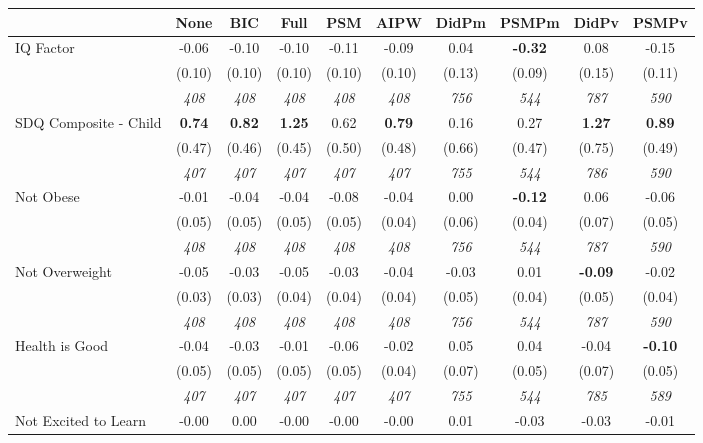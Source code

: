 \begin{tabular}{l c c c c c c c c c}
\toprule
 & None & BIC & Full & PSM & AIPW & DidPm & PSMPm & DidPv & PSMPv \\
\midrule
IQ Factor & -0.06 & -0.10 & -0.10 & -0.11 & -0.09 & 0.04 & \textbf{-0.32} & 0.08 & -0.15 \\
& (0.10) & (0.10) & (0.10) & (0.10) & (0.10) & (0.13) & (0.09) & (0.15) & (0.11) \\
& \textit{ 408 } & \textit{ 408 } & \textit{ 408 } & \textit{ 408 } & \textit{ 408 } & \textit{ 756 } & \textit{ 544 } & \textit{ 787 } & \textit{ 590 } \\
SDQ Composite - Child & \textbf{ 0.74 } & \textbf{ 0.82 } & \textbf{ 1.25 } & 0.62 & \textbf{0.79} & 0.16 & 0.27 & \textbf{ 1.27 } & \textbf{0.89} \\
& (0.47) & (0.46) & (0.45) & (0.50) & (0.48) & (0.66) & (0.47) & (0.75) & (0.49) \\
& \textit{ 407 } & \textit{ 407 } & \textit{ 407 } & \textit{ 407 } & \textit{ 407 } & \textit{ 755 } & \textit{ 544 } & \textit{ 786 } & \textit{ 590 } \\
Not Obese & -0.01 & -0.04 & -0.04 & -0.08 & -0.04 & 0.00 & \textbf{-0.12} & 0.06 & -0.06 \\
& (0.05) & (0.05) & (0.05) & (0.05) & (0.04) & (0.06) & (0.04) & (0.07) & (0.05) \\
& \textit{ 408 } & \textit{ 408 } & \textit{ 408 } & \textit{ 408 } & \textit{ 408 } & \textit{ 756 } & \textit{ 544 } & \textit{ 787 } & \textit{ 590 } \\
Not Overweight & -0.05 & -0.03 & -0.05 & -0.03 & -0.04 & -0.03 & 0.01 & \textbf{ -0.09 } & -0.02 \\
& (0.03) & (0.03) & (0.04) & (0.04) & (0.04) & (0.05) & (0.04) & (0.05) & (0.04) \\
& \textit{ 408 } & \textit{ 408 } & \textit{ 408 } & \textit{ 408 } & \textit{ 408 } & \textit{ 756 } & \textit{ 544 } & \textit{ 787 } & \textit{ 590 } \\
Health is Good & -0.04 & -0.03 & -0.01 & -0.06 & -0.02 & 0.05 & 0.04 & -0.04 & \textbf{-0.10} \\
& (0.05) & (0.05) & (0.05) & (0.05) & (0.04) & (0.07) & (0.05) & (0.07) & (0.05) \\
& \textit{ 407 } & \textit{ 407 } & \textit{ 407 } & \textit{ 407 } & \textit{ 407 } & \textit{ 755 } & \textit{ 544 } & \textit{ 785 } & \textit{ 589 } \\
Not Excited to Learn & -0.00 & 0.00 & -0.00 & -0.00 & -0.00 & 0.01 & -0.03 & -0.03 & -0.01 \\

\end{tabular}
